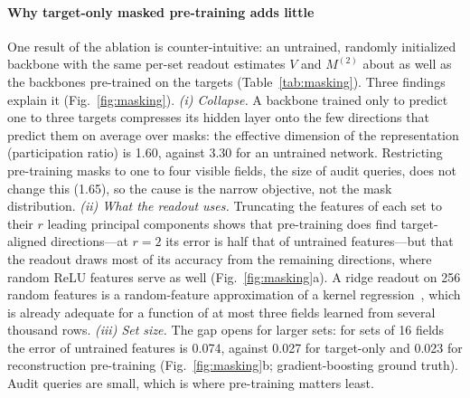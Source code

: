 \paragraph{Why target-only masked pre-training adds little}
One result of the ablation is counter-intuitive: an untrained, randomly initialized backbone with the same per-set
readout estimates $V$ and $M^{(2)}$ about as well as the backbones pre-trained on the targets
(Table~\ref{tab:masking}). Three findings explain it (Fig.~\ref{fig:masking}).
\emph{(i) Collapse.} A backbone trained only to predict one to three targets compresses its hidden layer onto the few
directions that predict them on average over masks: the effective dimension of the representation (participation
ratio) is 1.60, against 3.30 for an untrained network. Restricting pre-training masks to one to four visible
fields, the size of audit queries, does not change this (1.65), so the cause is the narrow objective, not the mask
distribution. \emph{(ii) What the readout uses.} Truncating the features of each set to their $r$ leading principal
components shows that pre-training does find target-aligned directions---at $r=2$ its error is half that of untrained
features---but that the readout draws most of its accuracy from the remaining directions, where random ReLU features
serve as well (Fig.~\ref{fig:masking}a). A ridge readout on 256 random features is a random-feature approximation of a
kernel regression~\cite{rahimi2007random}, which is already adequate for a function of at most three fields learned
from several thousand rows. \emph{(iii) Set size.} The gap opens for larger sets: for sets of 16 fields the error of
untrained features is 0.074, against 0.027 for target-only and 0.023 for reconstruction pre-training
(Fig.~\ref{fig:masking}b; gradient-boosting ground truth). Audit queries are small, which is where pre-training matters
least.


